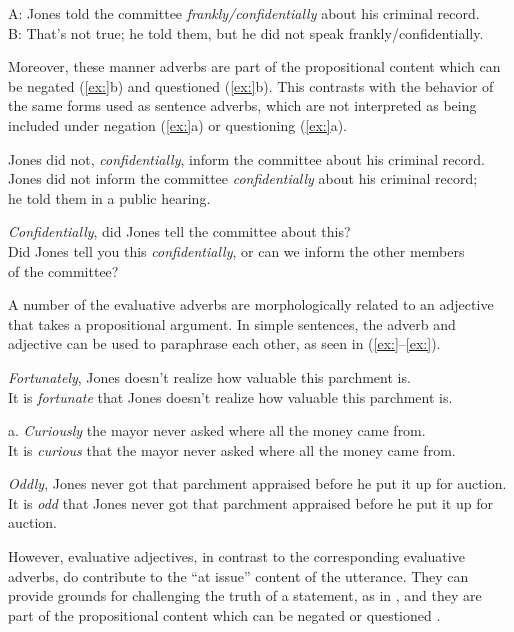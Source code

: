 \ea
A: Jones told the committee \textit{frankly/confidentially} about his criminal record.\\
B: That’s not true; he told them, but he did not speak frankly/confidentially.
\z


Moreover, these manner adverbs are part of the propositional content which can be negated (\ref{ex:}b) and questioned (\ref{ex:}b). This contrasts with the behavior of the same forms used as sentence adverbs, which are not interpreted as being included under negation (\ref{ex:}a) or questioning (\ref{ex:}a).


\ea
\ea Jones did not, \textit{confidentially}, inform the committee about his criminal record.\\
\ex Jones did not inform the committee \textit{confidentially} about his criminal record;\\
  he told them in a public hearing.
                       \z
\z

\ea
\ea \textit{Confidentially}, did Jones tell the committee about this?\\
\ex Did Jones tell you this \textit{confidentially}, or can we inform the other members\\
  of the committee?
                       \z
\z


A number of the evaluative adverbs are morphologically related to an adjective that takes a propositional argument. In simple sentences, the adverb and adjective can be used to paraphrase each other, as seen in (\ref{ex:}--\ref{ex:}).


\ea
\ea \textit{Fortunately}, Jones doesn’t realize how valuable this parchment is.\\
\ex It is \textit{fortunate} that Jones doesn’t realize how valuable this parchment is.
                       \z
\z

\ea






  a. \textit{Curiously} the mayor never asked where all the money came from.\\
\ex It is \textit{curious} that the mayor never asked where all the money came from.
\z

\ea
\ea \textit{Oddly}, Jones never got that parchment appraised before he put it up for auction.\\
\ex It is \textit{odd} that Jones never got that parchment appraised before he put it up for auction.
                       \z
\z


However, evaluative adjectives, in contrast to the corresponding evaluative adverbs, do contribute to the “at issue” content of the utterance. They can provide grounds for challenging the truth of a statement, as in , and they are part of the propositional content which can be negated  or questioned .


